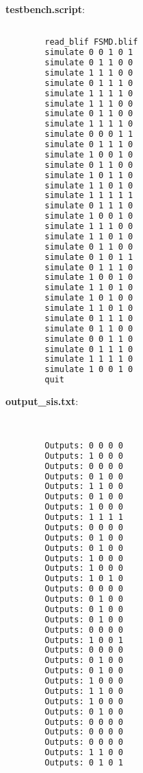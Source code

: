 \documentclass[a4paper]{article}
\begin{document}
\begin{figure}[H]
	\centering
	\begin{minipage}{\linewidth}
		\centering
		\begin{minipage}{0.45\linewidth}
			\textbf{testbench.script}:
			\begin{lstlisting}[language=bash]

        read_blif FSMD.blif
        simulate 0 0 1 0 1
        simulate 0 1 1 0 0
        simulate 1 1 1 0 0
        simulate 0 1 1 1 0
        simulate 1 1 1 1 0
        simulate 1 1 1 0 0
        simulate 0 1 1 0 0
        simulate 1 1 1 1 0
        simulate 0 0 0 1 1
        simulate 0 1 1 1 0
        simulate 1 0 0 1 0
        simulate 0 1 1 0 0
        simulate 1 0 1 1 0
        simulate 1 1 0 1 0
        simulate 1 1 1 1 1
        simulate 0 1 1 1 0
        simulate 1 0 0 1 0
        simulate 1 1 1 0 0
        simulate 1 1 0 1 0
        simulate 0 1 1 0 0
        simulate 0 1 0 1 1
        simulate 0 1 1 1 0
        simulate 1 0 0 1 0
        simulate 1 1 0 1 0
        simulate 1 0 1 0 0
        simulate 1 1 0 1 0
        simulate 0 1 1 1 0
        simulate 0 1 1 0 0
        simulate 0 0 1 1 0
        simulate 0 1 1 1 0
        simulate 1 1 1 1 0
        simulate 1 0 0 1 0
        quit
      \end{lstlisting}
		\end{minipage}
		\hspace{0.05\linewidth}
		\begin{minipage}{0.45\linewidth}
			\textbf{output\_sis.txt}:
			\begin{lstlisting}[language=sh]


        Outputs: 0 0 0 0
        Outputs: 1 0 0 0
        Outputs: 0 0 0 0
        Outputs: 0 1 0 0
        Outputs: 1 1 0 0
        Outputs: 0 1 0 0
        Outputs: 1 0 0 0
        Outputs: 1 1 1 1
        Outputs: 0 0 0 0
        Outputs: 0 1 0 0
        Outputs: 0 1 0 0
        Outputs: 1 0 0 0
        Outputs: 1 0 0 0
        Outputs: 1 0 1 0
        Outputs: 0 0 0 0
        Outputs: 0 1 0 0
        Outputs: 0 1 0 0
        Outputs: 0 1 0 0
        Outputs: 0 0 0 0
        Outputs: 1 0 0 1
        Outputs: 0 0 0 0
        Outputs: 0 1 0 0
        Outputs: 0 1 0 0
        Outputs: 1 0 0 0
        Outputs: 1 1 0 0
        Outputs: 1 0 0 0
        Outputs: 0 1 0 0
        Outputs: 0 0 0 0
        Outputs: 0 0 0 0
        Outputs: 0 0 0 0
        Outputs: 1 1 0 0
        Outputs: 0 1 0 1

      \end{lstlisting}
		\end{minipage}
	\end{minipage}
\end{figure}
\end{document}
